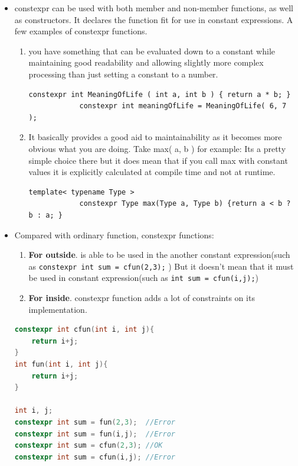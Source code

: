 \documentclass[a4paper,11pt,twoside]{book}
\begin{document}
\begin{itemize}
	\item constexpr can be used with both member and non-member functions, as well as constructors. It declares the function fit for use in constant expressions. A few examples of constexpr functions. 
	\begin{enumerate}
		\item you have something that can be evaluated down to a constant while maintaining good readability and allowing slightly more complex processing than just setting a constant to a number.
		\begin{lstlisting}[numbers=none]
			constexpr int MeaningOfLife ( int a, int b ) { return a * b; }
			constexpr int meaningOfLife = MeaningOfLife( 6, 7 );
		\end{lstlisting}
		
		\item It basically provides a good aid to maintainability as it becomes more obvious what you are doing. Take max( a, b ) for example: Its a pretty simple choice there but it does mean that if you call max with constant values it is explicitly calculated at compile time and not at runtime.
		\begin{lstlisting}[numbers=none]
			template< typename Type > 
			constexpr Type max(Type a, Type b) {return a < b ? b : a; }
		\end{lstlisting}
		
	\end{enumerate}
	
	\item Compared with ordinary function, constexpr functions:
	\begin{enumerate}
		\item \textbf{For outside}. is able to be used in the another constant expression(such as \texttt{constexpr int sum = cfun(2,3);} ) But it doesn't mean that it must be used in constant expression(such as \texttt{int sum = cfun(i,j);})
		
		
		\item \textbf{For inside}. constexpr function adds a lot of constraints on its implementation.
	\end{enumerate}
	
\begin{lstlisting}[frame=single, language=c++]
constexpr int cfun(int i, int j){
	return i+j;
}
int fun(int i, int j){
	return i+j;
}

int i, j;
constexpr int sum = fun(2,3);  //Error
constexpr int sum = fun(i,j);  //Error
constexpr int sum = cfun(2,3); //OK
constexpr int sum = cfun(i,j); //Error


\end{lstlisting}
\end{itemize}
\end{document}
